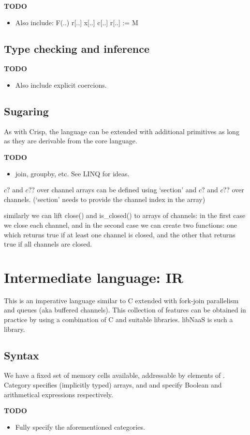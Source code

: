 \documentclass{article}
\newenvironment{todo}{\begin{mdframed}[backgroundcolor=gray!20]\bf TODO \begin{itemize}}{\end{itemize}\end{mdframed}}
\begin{document}
\begin{todo}
\item Also include: 
F(..)
r[..]
x[..]
c[..]
r[..] := M
\end{todo}


\subsection{Type checking and inference}
\begin{todo}
\item Also include explicit coercions.
\end{todo}


\subsection{Sugaring}
As with Crisp, the language can be extended with additional primitives as long
as they are derivable from the core language.
\begin{todo}
\item join, groupby, etc. See LINQ for ideas.
\end{todo}

$c?$ and $c??$ over channel arrays can be defined using `section' and
$c?$ and $c??$ over channels.
(`section' needs to provide the channel index in the array)

similarly we can lift close() and is\_closed()
to arrays of channels: in the first case we close each channel, and in the
second case we can create two functions: one which returns true if at least one
channel is closed, and the other that returns true if all channels are closed.


\section{Intermediate language: IR}
This is an imperative language similar to C extended with
fork-join parallelism and queues (aka buffered channels). This collection of
features can be obtained in practice by using a combination of C and suitable
libraries. libNaaS is such a library.

\subsection{Syntax}
We have a fixed set of memory cells available, addressable by elements of
.
Category  specifies (implicitly typed) arrays,
and  and  specify Boolean and
arithmetical expressions respectively.
\begin{todo}
\item Fully specify the aforementioned categories.
\end{todo}
\end{document}
